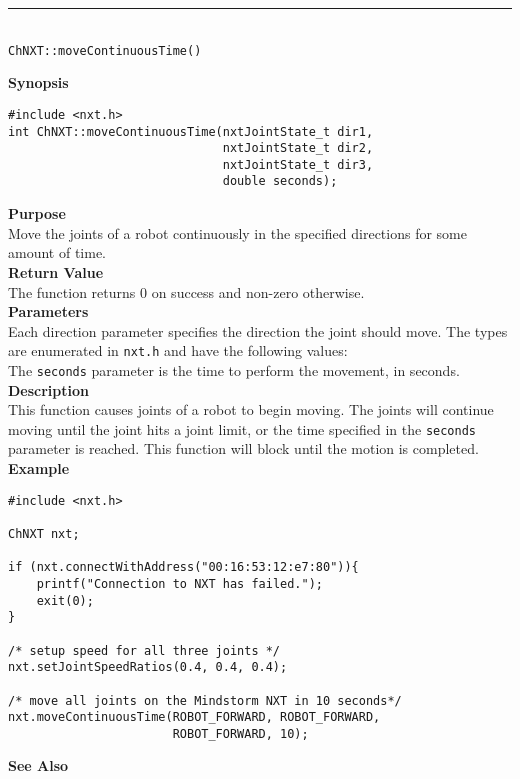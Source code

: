 \noindent
\vspace{5pt}
\rule{4.5in}{0.015in}\\
\noindent
{\LARGE \texttt{ChNXT::moveContinuousTime()} }\\


\noindent
{\bf Synopsis}
\vspace{-8pt}
\begin{verbatim}
#include <nxt.h>
int ChNXT::moveContinuousTime(nxtJointState_t dir1, 
                              nxtJointState_t dir2, 
                              nxtJointState_t dir3, 
                              double seconds);
\end{verbatim}

\noindent
{\bf Purpose}\\
Move the joints of a robot continuously in the specified directions for some amount of time.\\

\noindent
{\bf Return Value}\\
The function returns 0 on success and non-zero otherwise.\\

\noindent
{\bf Parameters}\\
Each direction parameter specifies the direction the joint should 
move. The types are enumerated in \texttt{nxt.h} and have the 
following values:\\  
\noindent
The \texttt{seconds} parameter is the time to perform the movement, in seconds.
\\

\noindent
{\bf Description}\\
This function causes joints of a robot to begin moving. The joints
will continue moving until the joint hits a joint limit, or the 
time specified in the \texttt{seconds} parameter is reached. This 
function will block until the motion is completed.\\

\noindent
{\bf Example}
\begin{verbatim}
#include <nxt.h> 

ChNXT nxt;

if (nxt.connectWithAddress("00:16:53:12:e7:80")){
    printf("Connection to NXT has failed.");
    exit(0);
}
 
/* setup speed for all three joints */
nxt.setJointSpeedRatios(0.4, 0.4, 0.4);

/* move all joints on the Mindstorm NXT in 10 seconds*/
nxt.moveContinuousTime(ROBOT_FORWARD, ROBOT_FORWARD, 
                       ROBOT_FORWARD, 10);
\end{verbatim}

\noindent
{\bf See Also}\\
